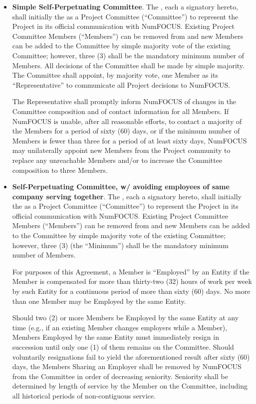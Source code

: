 \begin{itemize}

\item \textbf{Simple Self-Perpetuating Committee}. The \signatories{}, each a
  signatory hereto, shall initially  the
  \leadershipbody{} as a Project Committee (``Committee'') to represent the
  Project in its official communication with NumFOCUS.  Existing Project
  Committee Members (``Members'') can be removed from and new Members can be
  added to the Committee by simple majority vote of the existing Committee;
  however, three (3) shall be the mandatory minimum number of Members. All
  decisions of the Committee shall be made by simple majority. The Committee
  shall appoint, by majority vote, one Member as its ``Representative'' to
  communicate all Project decisions to NumFOCUS.


The Representative shall promptly inform NumFOCUS of changes in the Committee
composition and of contact information for all Members.  If NumFOCUS is unable,
after all reasonable efforts, to contact a majority of the Members for a period
of sixty (60) days, or if the minimum number of Members is fewer than three for
a period of at least sixty days, NumFOCUS may unilaterally appoint new Members
from the Project community to replace any unreachable Members and/or to
increase the Committee composition to three Members.

\item \textbf{Self-Perpetuating Committee, w/ avoiding employees of same
  company serving together}. The \signatories{}, each a signatory hereto, shall
  initially  the \leadershipbody{} as a Project
  Committee (``Committee'') to represent the Project in its official
  communication with NumFOCUS. Existing Project Committee Members (``Members'')
  can be removed from and new Members can be added to the Committee by simple
  majority vote of the existing Committee; however, three (3) (the ``Minimum'')
  shall be the mandatory minimum number of Members.


For purposes of this Agreement, a Member is ``Employed'' by an Entity if the
Member is compensated for more than thirty-two (32) hours of work per week by
such Entity for a continuous period of more than sixty (60) days. No more than
one Member may be Employed by the same Entity.


Should two (2) or more Members be Employed by the same Entity at any time
(e.g., if an existing Member changes employers while a Member), Members
Employed by the same Entity must immediately resign in succession until only
one (1) of them remains on the Committee. Should voluntarily resignations fail
to yield the aforementioned result after sixty (60) days, the Members Sharing
an Employer shall be removed by NumFOCUS from the Committee in order of
decreasing seniority. Seniority shall be determined by length of service by the
Member on the Committee, including all historical periods of non-contiguous
service.



\end{itemize}
